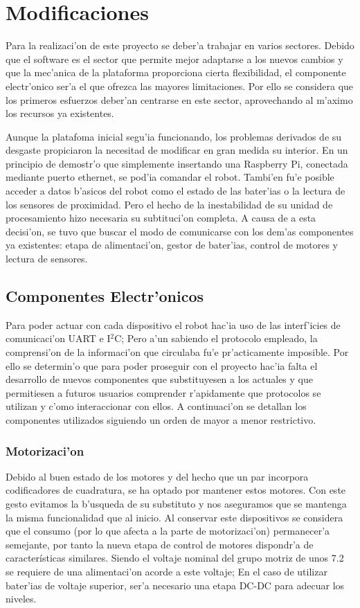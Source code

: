 \documentclass[twoside,12pt]{article}
\begin{document}
\newpage
\section{Modificaciones}
Para la realizaci'on de este proyecto se deber'a trabajar en varios sectores. Debido que el software es el sector que permite mejor adaptarse a los nuevos cambios y que la mec'anica de la plataforma proporciona cierta flexibilidad, el componente electr'onico ser'a el que ofrezca las mayores limitaciones. Por ello se considera que los primeros esfuerzos deber'an centrarse en este sector, aprovechando al m'aximo los recursos ya existentes.


Aunque la platafoma inicial segu'ia funcionando, los problemas derivados de su desgaste propiciaron la necesitad de modificar en gran medida su interior. En un principio de demostr'o que simplemente insertando una Raspberry Pi, conectada mediante puerto ethernet, se pod'ia comandar el robot. Tambi'en fu'e posible acceder a datos b'asicos del robot como el estado de las bater'ias o la lectura de los sensores de proximidad. Pero el hecho de la inestabilidad de su unidad de procesamiento hizo necesaria su subtituci'on completa. A causa de a esta decisi'on, se tuvo que buscar el modo de comunicarse con los dem'as componentes ya existentes: etapa de alimentaci'on, gestor de bater'ias, control de motores y lectura de sensores. 

\subsection{ Componentes Electr'onicos}
Para poder actuar con cada dispositivo el robot hac'ia uso de las interf'icies de comunicaci'on UART e I$^{2}$C; Pero a'un sabiendo el protocolo empleado, la comprensi'on de la informaci'on que circulaba fu'e pr'acticamente imposible. Por ello se determin'o que para poder proseguir con el proyecto hac'ia falta el desarrollo de nuevos componentes que substituyesen a los actuales y que permitiesen a futuros usuarios comprender r'apidamente que protocolos se utilizan y c'omo interaccionar con ellos. A continuaci'on se detallan los componentes utilizados siguiendo un orden de mayor a menor restrictivo.

\subsubsection{Motorizaci'on}
Debido al buen estado de los motores y del hecho que un par incorpora codificadores de cuadratura, se ha optado por mantener estos motores. Con este gesto evitamos la b'usqueda de su substituto y nos aseguramos que se mantenga la misma funcionalidad que al inicio. Al conservar este dispositivos se considera que el consumo (por lo que afecta a la parte de motorizaci'on) permanecer'a semejante, por tanto la nueva etapa de control de motores dispondr'a de características similares. Siendo el voltaje nominal del grupo motriz de unos 7.2 se requiere de una alimentaci'on acorde a este voltaje; En el caso de utilizar bater'ias de voltaje superior, ser'a necesario una etapa DC-DC para adecuar los niveles.
\end{document}
